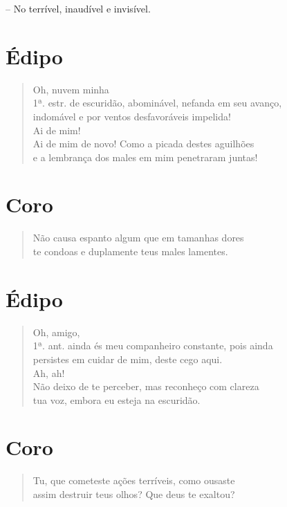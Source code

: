  --   No terrível, inaudível e invisível.

\section{Édipo} 

\begin{verse}Oh, nuvem minha\\ 1ª. estr.
de escuridão, abominável, nefanda em seu avanço,\\
indomável e por ventos desfavoráveis impelida!\\
Ai de mim!\\
Ai de mim de novo! Como a picada destes aguilhões\\
e a lembrança dos males em mim penetraram juntas!
\end{verse}


\section{Coro} 

\begin{verse}Não causa espanto algum que em tamanhas dores\\
te condoas e duplamente teus males lamentes. 
\end{verse}

\section{Édipo} 

\begin{verse}Oh, amigo,\\ 1ª. ant.
ainda és meu companheiro constante, pois ainda\\
persistes em cuidar de mim, deste cego aqui.\\
Ah, ah!\\
Não deixo de te perceber, mas reconheço com clareza\\
tua voz, embora eu esteja na escuridão.
\end{verse}


\section{Coro} 

\begin{verse}Tu, que cometeste ações terríveis, como ousaste\\
assim destruir teus olhos? Que deus te exaltou?
\end{verse}

